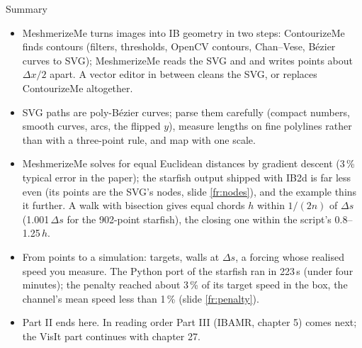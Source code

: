\documentclass[aspectratio=169,11pt]{beamer}
\begin{document}
\begin{frame}{Summary}
\label{fr:summary}
\footnotesize
\begin{itemize}
  \item MeshmerizeMe turns images into IB geometry in two steps: ContourizeMe finds contours (filters, thresholds, OpenCV contours, Chan--Vese, B\'ezier curves to SVG); MeshmerizeMe reads the SVG and  and writes points about $\Delta x/2$ apart. A vector editor in between cleans the SVG, or replaces ContourizeMe altogether.
  \item SVG paths are poly-B\'ezier curves; parse them carefully (compact numbers, smooth curves, arcs, the flipped $y$), measure lengths on fine polylines rather than with a three-point rule, and map with one scale.
  \item MeshmerizeMe solves for equal Euclidean distances by gradient descent (3\,\% typical error in the paper); the starfish output shipped with IB2d is far less even (its points are the SVG's nodes, slide \ref{fr:nodes}), and the example thins it further. A walk with bisection gives equal chords $h$ within $1/(2n)$ of $\Delta s$ (1.001\,$\Delta s$ for the 902-point starfish), the closing one within the script's 0.8--1.25\,$h$.
  \item From points to a simulation: targets, walls at $\Delta s$, a forcing whose realised speed you measure. The Python port of the starfish ran in 223\,s (under four minutes); the penalty reached about 3\,\% of its target speed in the box, the channel's mean speed less than 1\,\% (slide \ref{fr:penalty}).
  \item Part II ends here. In reading order Part III (IBAMR, chapter 5) comes next; the VisIt part continues with chapter 27.
\end{itemize}
\end{frame}
\end{document}
